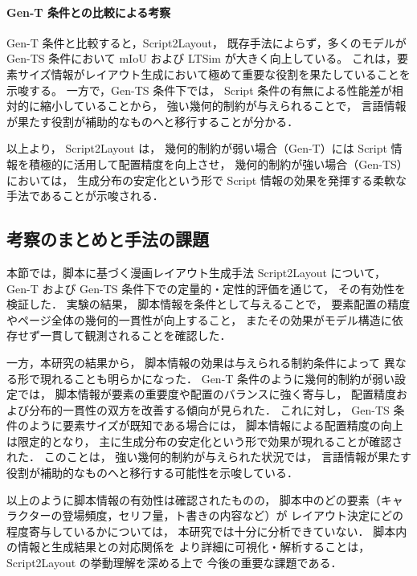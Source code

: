 \documentclass[a4j,12pt,dvipdfmx]{jsreport}
\begin{document}
\paragraph{Gen-T 条件との比較による考察}
Gen-T 条件と比較すると，Script2Layout， 既存手法によらず，多くのモデルが
Gen-TS 条件において
mIoU および LTSim が大きく向上している。
これは，要素サイズ情報がレイアウト生成において極めて重要な役割を果たしていることを示唆する。
一方で，Gen-TS 条件下では，
Script 条件の有無による性能差が相対的に縮小していることから，
強い幾何的制約が与えられることで，
言語情報が果たす役割が補助的なものへと移行することが分かる．

以上より，
Script2Layout は，
幾何的制約が弱い場合（Gen-T）には Script 情報を積極的に活用して配置精度を向上させ，
幾何的制約が強い場合（Gen-TS）においては，
生成分布の安定化という形で Script 情報の効果を発揮する柔軟な手法であることが示唆される．

\subsection{考察のまとめと手法の課題}
本節では，脚本に基づく漫画レイアウト生成手法 Script2Layout について，
Gen-T および Gen-TS 条件下での定量的・定性的評価を通じて，
その有効性を検証した．
実験の結果，
脚本情報を条件として与えることで，
要素配置の精度やページ全体の幾何的一貫性が向上すること，
またその効果がモデル構造に依存せず一貫して観測されることを確認した．

一方，本研究の結果から，
脚本情報の効果は与えられる制約条件によって
異なる形で現れることも明らかになった．
Gen-T 条件のように幾何的制約が弱い設定では，
脚本情報が要素の重要度や配置のバランスに強く寄与し，
配置精度および分布的一貫性の双方を改善する傾向が見られた．
これに対し，
Gen-TS 条件のように要素サイズが既知である場合には，
脚本情報による配置精度の向上は限定的となり，
主に生成分布の安定化という形で効果が現れることが確認された．
このことは，
強い幾何的制約が与えられた状況では，
言語情報が果たす役割が補助的なものへと移行する可能性を示唆している．

以上のように脚本情報の有効性は確認されたものの，
脚本中のどの要素（キャラクターの登場頻度，セリフ量，ト書きの内容など）が
レイアウト決定にどの程度寄与しているかについては，
本研究では十分に分析できていない．
脚本内の情報と生成結果との対応関係を
より詳細に可視化・解析することは，
Script2Layout の挙動理解を深める上で
今後の重要な課題である．

\ifdefined\ismain\else
  \printbibliography[title=参考文献]
\fi
\end{document}
